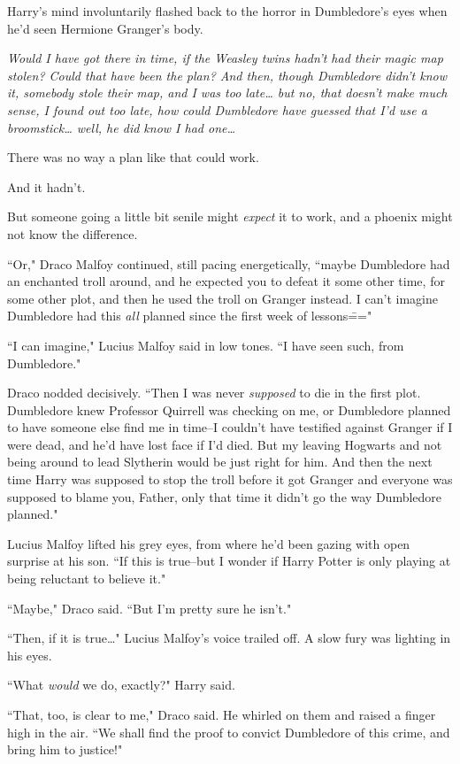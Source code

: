 Harry's mind involuntarily flashed back to the horror in Dumbledore's eyes when he'd seen Hermione Granger's body.

\emph{Would I have got there in time, if the Weasley twins hadn't had their magic map stolen? Could that have been the plan? And then, though Dumbledore didn't know it, somebody stole their map, and I was too late{\ldots} but no, that doesn't make much sense, I found out too late, how could Dumbledore have guessed that I'd use a broomstick{\ldots} well, he did know I had one{\ldots}}

There was no way a plan like that could work.

And it hadn't.

But someone going a little bit senile might \emph{expect} it to work, and a phoenix might not know the difference.

``Or," Draco Malfoy continued, still pacing energetically, ``maybe Dumbledore had an enchanted troll around, and he expected you to defeat it some other time, for some other plot, and then he used the troll on Granger instead. I can't imagine Dumbledore had this \emph{all} planned since the first week of lessons\==="

``I can imagine," Lucius Malfoy said in low tones. ``I have seen such, from Dumbledore."

Draco nodded decisively. ``Then I was never \emph{supposed} to die in the first plot. Dumbledore knew Professor Quirrell was checking on me, or Dumbledore planned to have someone else find me in time\---I couldn't have testified against Granger if I were dead, and he'd have lost face if I'd died. But my leaving Hogwarts and not being around to lead Slytherin would be just right for him. And then the next time Harry was supposed to stop the troll before it got Granger and everyone was supposed to blame you, Father, only that time it didn't go the way Dumbledore planned."

Lucius Malfoy lifted his grey eyes, from where he'd been gazing with open surprise at his son. ``If this is true\---but I wonder if Harry Potter is only playing at being reluctant to believe it."

``Maybe," Draco said. ``But I'm pretty sure he isn't."

``Then, if it is true{\ldots}" Lucius Malfoy's voice trailed off. A slow fury was lighting in his eyes.

``What \emph{would} we do, exactly?" Harry said.

``That, too, is clear to me," Draco said. He whirled on them and raised a finger high in the air. ``We shall find the proof to convict Dumbledore of this crime, and bring him to justice!"

